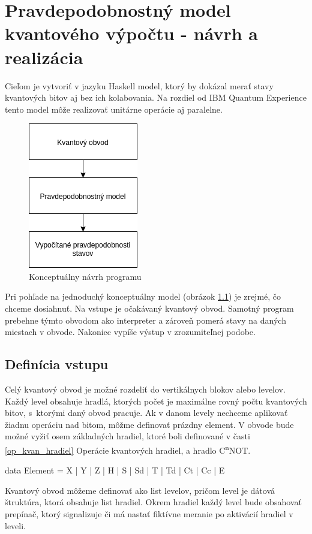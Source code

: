 
\chapter{Pravdepodobnostný model kvantového výpočtu - návrh a realizácia}

Cieľom je vytvoriť v jazyku Haskell model, ktorý by dokázal merať stavy
kvantových bitov aj bez ich kolabovania. Na rozdiel od IBM Quantum
Experience tento model môže realizovať unitárne operácie aj paralelne.

\begin{figure}
	\centering 
	\includegraphics[width=.2\textwidth]{figures/navrh.png} 
	\caption{Konceptuálny návrh programu}
    \label{navrh}
\end{figure}


Pri pohľade na jednoduchý konceptuálny model (obrázok \ref{navrh}) je zrejmé,
čo chceme dosiahnuť. Na vstupe je očakávaný kvantový obvod. Samotný program
prebehne týmto obvodom ako interpreter a zároveň pomerá stavy na daných
miestach v obvode. Nakoniec vypíše výstup v zrozumiteľnej podobe.

\section{Definícia vstupu}

Celý kvantový obvod je možné rozdeliť do vertikálnych blokov alebo levelov.
Každý level obsahuje hradlá, ktorých počet je maximálne rovný počtu 
kvantových bitov, s~ktorými daný obvod pracuje. Ak v danom levely nechceme
aplikovať žiadnu operáciu nad bitom, môžme definovať prázdny element.
V obvode bude možné vyžiť osem základných hradiel, ktoré boli definované
v časti \ref{op_kvan_hradiel} Operácie kvantových hradiel, a hradlo 
C\textsuperscript{n}NOT.

\begin{code}
data Element = X
    | Y
    | Z
    | H
    | S
    | Sd
    | T
    | Td
    | Ct
    | Cc
    | E
\end{code}

Kvantový obvod môžeme definovať ako list levelov, pričom level je dátová
štruktúra, ktorá obsahuje list hradiel. Okrem hradiel každý level bude
obsahovať prepínač, ktorý signalizuje či má nastať fiktívne meranie po 
aktivácií hradiel v leveli.

